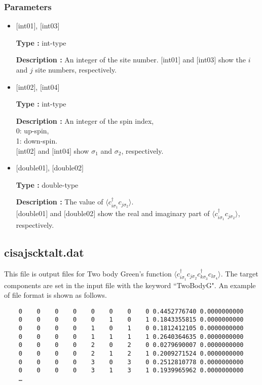 \subsubsection{Parameters}
 \begin{itemize}

  \item  $[$int01$]$, $[$int03$]$

 {\bf Type :} int-type

{\bf Description :} An integer of the site number. $[$int01$]$ and $[$int03$]$ show the $i$ and $j$ site numbers, respectively.
 
  \item  $[$int02$]$, $[$int04$]$

 {\bf Type :} int-type 

{\bf Description :} An integer of the spin index,\\
   0: up-spin,\\
   1: down-spin.\\ 
$[$int02$]$ and $[$int04$]$ show $\sigma_1$ and $\sigma_2$, respectively. \\

  \item  $[$double01$]$, $[$double02$]$

 {\bf Type :} double-type 

{\bf Description :} The value of $\langle c_{i\sigma_1}^{\dagger}c_{j\sigma_2}\rangle$.\\
$[$double01$]$ and $[$double02$]$ show the real and imaginary part of $\langle c_{i\sigma_1}^{\dagger}c_{j\sigma_2}\rangle$, respectively.
\end{itemize}

\newpage
\subsection{cisajscktalt.dat}
\label{Subsec:cisajscktalt}
This file is output files for Two body Green's function $\langle c_{i\sigma_1}^{\dagger}c_{j\sigma_2}c_{k\sigma_3}^{\dagger}c_{l\sigma_4}\rangle$. 
The target components are set in the input file with the keyword ``TwoBodyG".
An example of file format is shown as follows.

\begin{minipage}{15cm}
\begin{screen}
\begin{verbatim}
    0    0    0    0    0    0    0    0 0.4452776740 0.0000000000
    0    0    0    0    0    1    0    1 0.1843355815 0.0000000000
    0    0    0    0    1    0    1    0 0.1812412105 0.0000000000
    0    0    0    0    1    1    1    1 0.2640364635 0.0000000000
    0    0    0    0    2    0    2    0 0.0279690007 0.0000000000
    0    0    0    0    2    1    2    1 0.2009271524 0.0000000000
    0    0    0    0    3    0    3    0 0.2512810778 0.0000000000
    0    0    0    0    3    1    3    1 0.1939965962 0.0000000000
    …
\end{verbatim}
\end{screen}
\end{minipage}

